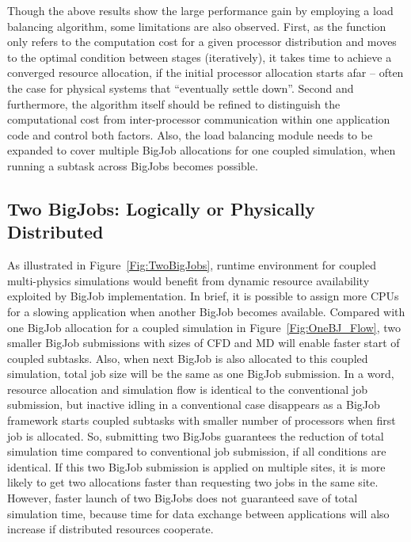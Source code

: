 \documentclass[conference,final]{IEEEtran}
\begin{document}
Though the above results show the large performance gain by employing
a load balancing algorithm, some limitations are also observed. First,
as the function only refers to the computation cost for a given processor
distribution and moves to the optimal condition between stages (iteratively), it takes
time to achieve a converged resource allocation, if the initial processor
allocation starts afar -- often the case for physical systems 
that ``eventually settle down''. Second and furthermore, the
algorithm itself should be refined to distinguish the computational
cost from inter-processor communication within one application code
and control both factors. Also, the load balancing module needs to be
expanded to cover multiple BigJob allocations for one coupled
simulation, when running a subtask across BigJobs becomes possible.

\subsection{Two BigJobs: Logically or Physically Distributed}

As illustrated in Figure~\ref{Fig:TwoBigJobs}, runtime environment for
coupled multi-physics simulations would benefit from dynamic resource
availability exploited by BigJob implementation. In brief, it is
possible to assign more CPUs for a slowing application when another
BigJob becomes available. Compared with one BigJob allocation for a
coupled simulation in Figure~\ref{Fig:OneBJ_Flow}, two smaller BigJob
submissions with sizes of CFD and MD will enable faster start of
coupled subtasks. Also, when next BigJob is also allocated to this
coupled simulation, total job size will be the same as one BigJob
submission. In a word, resource allocation and simulation flow is
identical to the conventional job submission, but inactive idling in a
conventional case disappears as a BigJob framework starts coupled
subtasks with smaller number of processors when first job is
allocated. So, submitting two BigJobs guarantees the reduction of
total simulation time compared to conventional job submission, if all
conditions are identical. If this two BigJob submission is applied on
multiple sites, it is more likely to get two allocations faster than
requesting two jobs in the same site. However, faster launch of two
BigJobs does not guaranteed save of total simulation time, because
time for data exchange between applications will also increase if
distributed resources cooperate.
\end{document}
